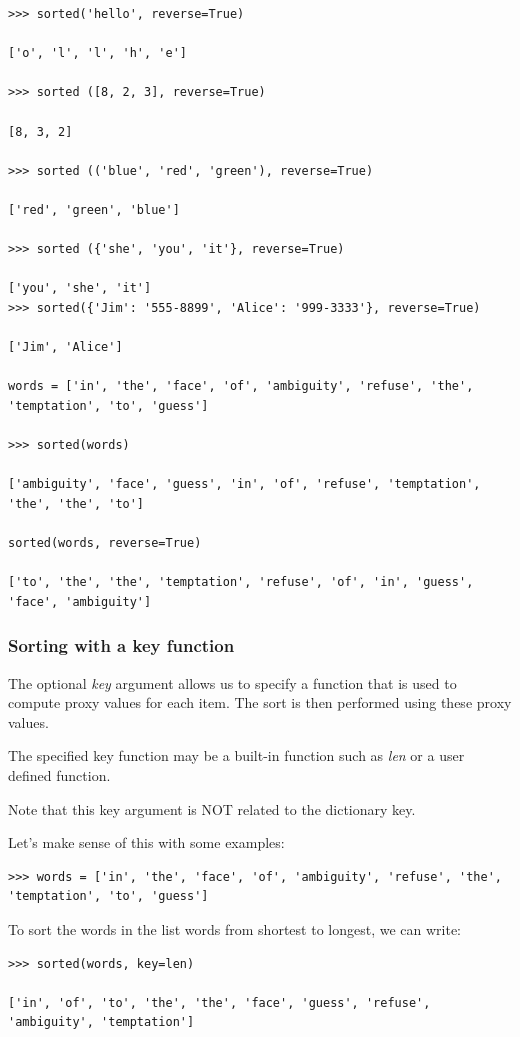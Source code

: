 \documentclass{article}
\begin{document}
\begin{lstlisting}
>>> sorted('hello', reverse=True)

['o', 'l', 'l', 'h', 'e']

>>> sorted ([8, 2, 3], reverse=True)

[8, 3, 2]

>>> sorted (('blue', 'red', 'green'), reverse=True)

['red', 'green', 'blue']

>>> sorted ({'she', 'you', 'it'}, reverse=True)

['you', 'she', 'it']
>>> sorted({'Jim': '555-8899', 'Alice': '999-3333'}, reverse=True)

['Jim', 'Alice']

words = ['in', 'the', 'face', 'of', 'ambiguity', 'refuse', 'the', 'temptation', 'to', 'guess']

>>> sorted(words)

['ambiguity', 'face', 'guess', 'in', 'of', 'refuse', 'temptation', 'the', 'the', 'to']

sorted(words, reverse=True)

['to', 'the', 'the', 'temptation', 'refuse', 'of', 'in', 'guess', 'face', 'ambiguity']
\end{lstlisting}

\subsubsection{Sorting with a key function}

The optional \textit{key} argument allows us to specify a function that is used to compute proxy values for each item. The sort is then performed using these proxy values.  

The specified key function may be a built-in function such as \textit{len} or a user defined function.

Note that this key argument is NOT related to the dictionary key.

Let's make sense of this with some examples:

\begin{lstlisting}
>>> words = ['in', 'the', 'face', 'of', 'ambiguity', 'refuse', 'the', 'temptation', 'to', 'guess']
\end{lstlisting}

To sort the words in the list words from shortest to longest, we can write:

\begin{lstlisting}
>>> sorted(words, key=len)

['in', 'of', 'to', 'the', 'the', 'face', 'guess', 'refuse', 'ambiguity', 'temptation']
\end{lstlisting}
\end{document}
